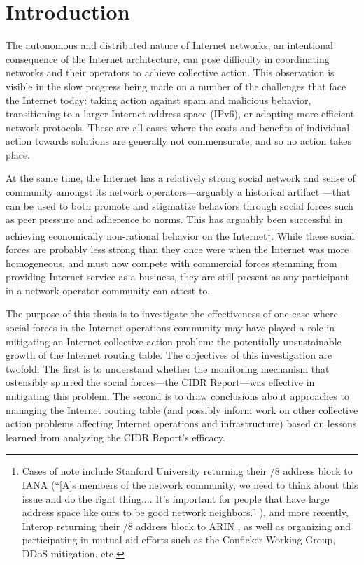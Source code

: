 \chapter{Introduction}
\label{chap:intro}

The autonomous and distributed nature of Internet networks, an intentional
consequence of the Internet architecture, can pose difficulty in coordinating
networks and their operators to achieve collective action. This observation is
visible in the slow progress being made on a number of the challenges that face
the Internet today: taking action against spam and malicious behavior,
transitioning to a larger Internet address space (IPv6), or adopting more
efficient network protocols. These are all cases where the costs and benefits
of individual action towards solutions are generally not commensurate, and so
no action takes place.

At the same time, the Internet has a relatively strong social network and sense
of community amongst its network operators---arguably a historical artifact
\cite{Mathew:2010ly}---that can be used to both promote and stigmatize
behaviors through social forces such as peer pressure and adherence to norms.
This has arguably been successful in achieving economically non-rational
behavior on the Internet\footnote{Cases of note include Stanford University
returning their /8 address block to IANA (``[A]s members of the network
community, we need to think about this issue and do the right thing.... It's
important for people that have large address space like ours to be good network
neighbors.'' \cite{Marsan:2000cr}), and more recently, Interop returning their
/8 address block to ARIN \cite{ARIN:2010nx}, as well as
organizing and participating in mutual aid efforts such as the Conficker
Working Group, DDoS mitigation, etc.}.
While these social forces are probably less strong than they once were when the
Internet was more homogeneous, and must now compete with commercial forces
stemming from providing Internet service as a business, they are still present
as any participant in a network operator community can attest to.

The purpose of this thesis is to investigate the effectiveness of one case
where social forces in the Internet operations community may have played a role
in mitigating an Internet collective action problem: the potentially
unsustainable growth of the Internet routing table. The objectives of this
investigation are twofold. The first is to understand whether the monitoring
mechanism that ostensibly spurred the social forces---the CIDR Report---was
effective in mitigating this problem. The second is to draw conclusions about
approaches to managing the Internet routing table (and possibly inform work on
other collective action problems affecting Internet operations and
infrastructure) based on lessons learned from analyzing the CIDR Report's
efficacy.
%

